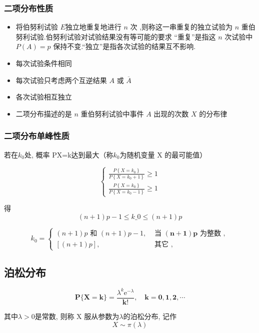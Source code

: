 \subsubsection{二项分布性质}

\begin{itemize}
    \item 将伯努利试验 $E$独立地重复地进行 $n$ 次 ,则称这一串重复的独立试验为 $n$ 重伯努利试验.伯努利试验对试验结果没有等可能的要求 “重复”是指这 $n$ 次试验中 $P(A)= p$ 保持不变.“独立”是指各次试验的结果互不影响.
    \item 每次试验条件相同
    \item 每次试验只考虑两个互逆结果 $A$ 或 $\overline{A}$
    \item 各次试验相互独立
    \item 二项分布描述的是 $n$ 重伯努利试验中事件 $A$ 出现的次数 $X$ 的分布律
\end{itemize}

\subsubsection{二项分布单峰性质}

若在$k_0$处, 概率 P{X=k}达到最大（称$k_0$为随机变量 X 的最可能值）

$$
\left\{\begin{array}{l}
\frac{P\left\{X=k_{0}\right\}}{P\left\{X=k_{0}+1\right\}} \geq 1 \\
\frac{P\left\{X=k_{0}\right\}}{P\left\{X=k_{0}-1\right\}} \geq 1
\end{array}\right.
$$

得
$$ (n+1) p-1 \leq k\_{0} \leq(n+1) p $$

$$
k_{0}=\left\{\begin{array}{ll}
(n+1) p \text { 和 }(n+1) p-1, & \text { 当 }(\boldsymbol{n}+\mathbf{1}) \boldsymbol{p} \text { 为整数 }, \\
{[(n+1) p],} & \text { 其它 },
\end{array}\right.
$$

\subsection{泊松分布}

$$
\boldsymbol{P}\{\boldsymbol{X}=\boldsymbol{k}\}=\frac{\lambda^{k} \mathrm{e}^{-\lambda}}{\boldsymbol{k} !}, \quad \boldsymbol{k}=\mathbf{0}, \mathbf{1}, \mathbf{2}, \cdots
$$

其中$\lambda > 0$是常数, 则称 X 服从参数为$\lambda$的泊松分布, 记作
$$ X \sim \pi(\lambda) $$



